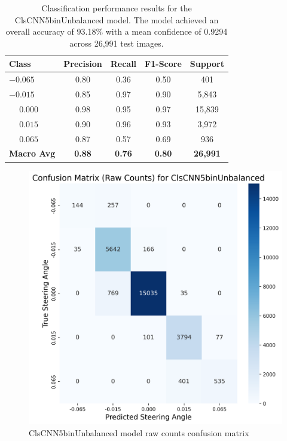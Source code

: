 \begin{table}[htbp]
\centering
\begin{tabular}{@{}lcccc@{}}
\toprule
\textbf{Class} & \textbf{Precision} & \textbf{Recall} & \textbf{F1-Score} & \textbf{Support} \\
\midrule
$-0.065$ & 0.80 & 0.36 & 0.50 & 401 \\
$-0.015$ & 0.85 & 0.97 & 0.90 & 5,843 \\
$\phantom{-}0.000$ & 0.98 & 0.95 & 0.97 & 15,839 \\
$\phantom{-}0.015$ & 0.90 & 0.96 & 0.93 & 3,972 \\
$\phantom{-}0.065$ & 0.87 & 0.57 & 0.69 & 936 \\
\midrule
\textbf{Macro Avg} & \textbf{0.88} & \textbf{0.76} & \textbf{0.80} & \textbf{26,991} \\
\bottomrule
\end{tabular}
\caption{Classification performance results for the ClsCNN5binUnbalanced model. The model achieved an overall accuracy of 93.18\% with a mean confidence of 0.9294 across 26,991 test images.}
\label{tab:clf_report_ClsCNN5binUnbalanced}
\end{table}

\begin{figure}[H]
\centering
\includegraphics[width=0.65\linewidth]{Figures/Results/cm_raw_ClsCNN5binUnbalanced.png}
\caption{ClsCNN5binUnbalanced model raw counts confusion matrix}
\label{fig:cm_raw_ClsCNN5binUnbalanced}
\end{figure}

